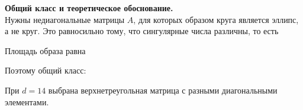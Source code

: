 \documentclass[a4paper,14pt]{extarticle}
\begin{document}
\textbf{Общий класс и теоретическое обоснование.}\\
Нужны недиагональные матрицы \(A\), для которых образом круга является
эллипс, а не круг. Это равносильно тому, что сингулярные числа различны,
то есть \begin{center}\end{center} Площадь образа равна \begin{center}\end{center} Поэтому общий класс: \begin{center}\end{center} При \(d=14\) выбрана верхнетреугольная матрица с разными
диагональными элементами.
\end{document}

